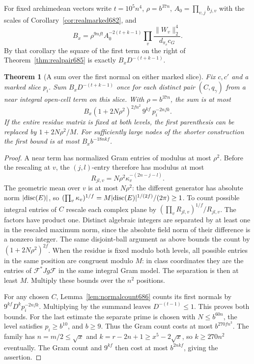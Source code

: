 \documentclass[a4paper,11pt]{article}
\newtheorem{theorem}[proposition]{Theorem}
\theoremstyle{definition}
\theoremstyle{remark}
\numberwithin{equation}{section}
\begin{document}
For fixed archimedean vectors write \(t=10^5n^4\),
\(\rho=b^{37n}\), \(A_0=\prod_{v,j}b_{j,v}\) with the scales of
Corollary~\ref{cor:realmarked682}, and
\[
  B_x=\rho^{9nft} A_0^{-2(t+k-1)}
             \prod_v\frac{\|W_v\|_2^4}{d_{\pi_v}c_G}.
\]
By that corollary the square of the first term on the right
of Theorem~\ref{thm:realpair685} is exactly
\(B_xD^{-(t+k-1)}\).

\begin{theorem}[A sum over the first normal on either marked slice]
\leavevmode\label{thm:firstnormalsum686}
Fix \(c,c'\) and a marked slice \(p_i\).
Sum \(B_xD^{-(t+k-1)}\) once for each distinct pair
\((C,q_\gamma)\) from a near integral open-cell term on this
slice. With \(\rho=b^{37n}\), the sum is at most
\[
       B_x(1+2N\rho^2)^{2fn^2}\,9^{kf}\,p_i^{-2nfk}.
\]
If the entire residue matrix is fixed at both levels, the first
parenthesis can be replaced by \(1+2N\rho^2/M\).
For sufficiently large nodes of the shorter construction the
first bound is at most \(B_x b^{-18nkf}\).
\end{theorem}
\begin{proof}
A near term has normalized Gram entries of modulus at most
\(\rho^2\). Before the rescaling at \(v\), the \((j,l)\)-entry
therefore has modulus at most
\[
      R_{jl,v}=N\rho^2\kappa_v^{-(2n-j-l)} .
\]
The geometric mean over \(v\) is at most \(N\rho^2\): the
different generator has absolute norm \(|{\rm disc}(E)|\),
so \((\prod_v\kappa_v)^{1/f}
=M|{\rm disc}(E)|^{1/(2f)}/(2\pi)\ge1\).
To count possible integral entries of \(C\) rescale each
complex plane by \((\prod_v R_{jl,v})^{1/f}/R_{jl,v}\).
The factors have product one. Distinct algebraic integers
are separated by at least one in the rescaled maximum norm,
since the absolute field norm of their difference is a
nonzero integer. The same disjoint-ball argument as above
bounds the count by \((1+2N\rho^2)^{2f}\).
When the residue is fixed modulo both levels, all possible
entries in the same position are congruent modulo \(M\):
in class coordinates they are the entries of
\(\mathcal F^*Jg\mathcal F\) in the same integral Gram model.
The separation is then at least \(M\). Multiply these bounds
over the \(n^2\) positions.

For any chosen \(C\), Lemma~\ref{lem:normalcount686} counts
its first normals by \(9^{kf}D^k p_i^{-2nfk}\).
Multiplying by the summand leaves \(D^{-(t-1)}\le1\).
This proves both bounds. For the last estimate the separate
prime is chosen with \(N\le b^{60n}\), the level satisfies
\(p_i\ge b^{10}\), and \(b\ge9\). Thus the Gram count costs
at most \(b^{270fn^3}\). The family has
\(n=m/2\le\sqrt x\) and \(k=r-2n+1\ge x^5-2\sqrt x\), so
\(k\ge270n^2\) eventually. The Gram count and \(9^{kf}\)
then cost at most \(b^{2nkf}\), giving the assertion.
\end{proof}
\end{document}
